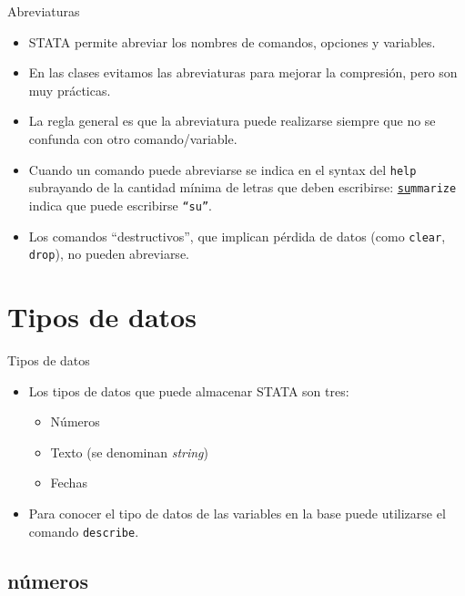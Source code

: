 \documentclass{beamer}
\begin{document}
\begin{frame}{Abreviaturas}
\begin{itemize}
\item STATA permite abreviar los nombres de comandos, opciones y variables.
\item En las clases evitamos las abreviaturas para mejorar la compresión, pero son muy prácticas.
\item La regla general es que la abreviatura puede realizarse siempre que no se confunda con otro comando/variable.
\item Cuando un comando puede abreviarse se indica en el syntax del \texttt{help} subrayando de la cantidad mínima de letras que deben escribirse: \texttt{\underline{su}mmarize} indica que puede escribirse \texttt{``su''}.
\item Los comandos ``destructivos'', que implican pérdida de datos (como \texttt{clear}, \texttt{drop}), no pueden abreviarse.
\end{itemize}
\end{frame}

\section{Tipos de datos}

\begin{frame}{Tipos de datos}
\begin{itemize}
\item Los tipos de datos que puede almacenar STATA son tres: 
\begin{itemize}
\item Números
\item Texto (se denominan \textit{string})
\item Fechas
\end{itemize}
\item Para conocer el tipo de datos de las variables en la base puede utilizarse el comando \texttt{describe}.
\end{itemize}
\end{frame}

\subsection{números}
\end{document}

